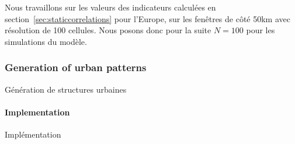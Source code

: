 Nous travaillons sur les valeurs des indicateurs calculées en section~\ref{sec:staticcorrelations} pour l'Europe, sur les fenêtres de côté 50km avec résolution de 100 cellules. Nous posons donc pour la suite $N=100$ pour les simulations du modèle.





\subsubsection*{Generation of urban patterns}{Génération de structures urbaines}


\paragraph{Implementation}{Implémentation}

